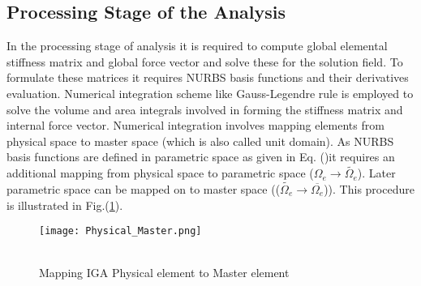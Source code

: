 \documentclass[11pt]{article}
\begin{document}
\subsection{Processing Stage of the Analysis}
In the processing stage of analysis it is required to compute global elemental
stiffness matrix and global force vector and solve these for the solution field.
To formulate these matrices it requires NURBS basis functions and their
derivatives evaluation. Numerical integration scheme like Gauss-Legendre rule is
employed to solve the volume and area integrals involved in forming the
stiffness matrix and internal force vector. Numerical integration involves
mapping elements from physical space to master space (which is also called unit
domain). As NURBS basis functions are defined in parametric space as given in
Eq. ()it requires an additional mapping from physical space to parametric space
($\Omega_e \rightarrow \widetilde{\Omega_e}$). Later parametric space can be
mapped on to master space (($\widetilde{\Omega_e} \rightarrow
\overline{\Omega_e}$)). This procedure is illustrated in
Fig.(\ref{MasterPhysical}).
\begin{figure}[H]
	\begin{center}
		\texttt{[image: Physical\_Master.png]} 
		\caption{\\Mapping IGA Physical element to Master
			element}\label{MasterPhysical}
	\end{center}	
\end{figure}
\end{document}
